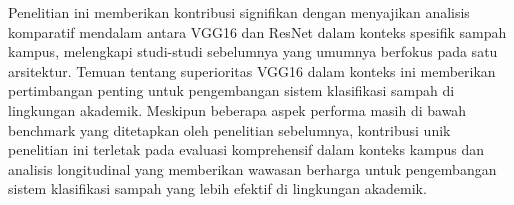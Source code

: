 \documentclass[12pt,a4paper]{article}
\begin{document}
\begin{adjustwidth}{3em}{0pt}
Penelitian ini memberikan kontribusi signifikan dengan menyajikan analisis komparatif mendalam antara VGG16 dan ResNet dalam konteks spesifik sampah kampus, melengkapi studi-studi sebelumnya yang umumnya berfokus pada satu arsitektur. Temuan tentang superioritas VGG16 dalam konteks ini memberikan pertimbangan penting untuk pengembangan sistem klasifikasi sampah di lingkungan akademik. Meskipun beberapa aspek performa masih di bawah benchmark yang ditetapkan oleh penelitian sebelumnya, kontribusi unik penelitian ini terletak pada evaluasi komprehensif dalam konteks kampus dan analisis longitudinal yang memberikan wawasan berharga untuk pengembangan sistem klasifikasi sampah yang lebih efektif di lingkungan akademik.

\end{adjustwidth}



\end{document}
